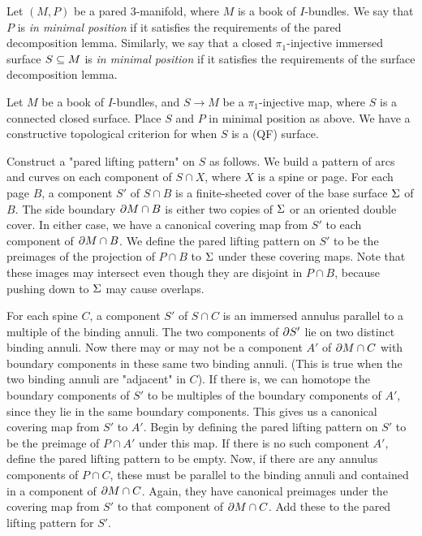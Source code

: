 \begin{defn}

Let $(M,P)$ be a pared 3-manifold, where $M$ is a book of $I$-bundles.  We say
that $P$ is \emph{in minimal position} if it satisfies the requirements of the
pared decomposition lemma. Similarly, we say that a closed $\pi_1$-injective
immersed surface $S\subseteq M$ is \emph{in minimal position} if it satisfies the
requirements of the surface decomposition lemma.

\end{defn}

Let $M$ be a book of $I$-bundles, and $S \to M$ be a $\pi_1$-injective map,
where $S$ is a connected closed surface.  Place $S$ and $P$ in minimal position
as above.  We have a constructive topological criterion for when $S$ is a (QF)
surface.

Construct a "pared lifting pattern" on $S$ as follows. We build a pattern of
arcs and curves on each component of $S \cap X$, where $X$ is a spine or page.
For each page $B$, a component $S'$ of $S \cap B$ is a finite-sheeted cover of
the base surface $\Sigma$ of $B$. The side boundary $\partial M \cap B$ is either two
copies of $\Sigma$ or an oriented double cover. In either case, we have
a canonical covering map from $S'$ to each component of $\partial M \cap B$. We
define the pared lifting pattern on $S'$ to be the preimages of the projection
of $P \cap B$ to $\Sigma$ under these covering maps.  Note that these images may
intersect even though they are disjoint in $P \cap B$, because pushing down to
$\Sigma$ may cause overlaps.

For each spine $C$, a component $S'$ of $S \cap C$ is an immersed annulus
parallel to a multiple of the binding annuli.  The two components of $\partial S'$
lie on two distinct binding annuli. Now there may or may not be a component
$A'$ of $\partial M \cap C$ with boundary components in these same two binding
annuli.  (This is true when the two binding annuli are "adjacent" in $C$). If
there is, we can homotope the boundary components of $S'$ to be multiples of
the boundary components of $A'$, since they lie in the same boundary
components.  This gives us a canonical covering map from $S'$ to $A'$. Begin by
defining the pared lifting pattern on $S'$ to be the preimage of $P \cap A'$
under this map. If there is no such component $A'$, define the pared lifting
pattern to be empty.  Now, if there are any annulus components of $P \cap C$,
these must be parallel to the binding annuli and contained in a component of
$\partial M \cap C$.  Again, they have canonical preimages under the covering map
from $S'$ to that component of $\partial M \cap C$. Add these to the pared lifting
pattern for $S'$.

